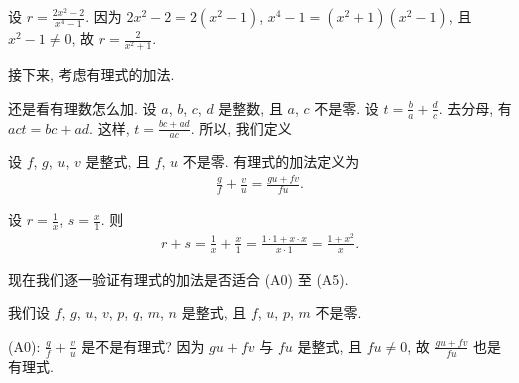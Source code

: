 \begin{example}
    设 $r = \frac{2x^2 - 2}{x^4 - 1}$. 因为 $2x^2 - 2 = 2(x^2 - 1)$, $x^4 - 1 = (x^2 + 1)(x^2 - 1)$, 且 $x^2 - 1 \neq 0$, 故 $r = \frac{2}{x^2 + 1}$.
\end{example}

接下来, 考虑有理式的加法.

还是看有理数怎么加. 设 $a$, $b$, $c$, $d$ 是整数, 且 $a$, $c$ 不是零. 设 $t = \frac{b}{a} + \frac{d}{c}$. 去分母, 有 $act = bc + ad$. 这样, $t = \frac{bc + ad}{ac}$. 所以, 我们定义
\begin{definition}
    设 $f$, $g$, $u$, $v$ 是整式, 且 $f$, $u$ 不是零. 有理式的加法定义为
    \begin{align*}
        \frac{g}{f} + \frac{v}{u} = \frac{gu + fv}{fu}.
    \end{align*}
\end{definition}

\begin{example}
    设 $r = \frac{1}{x}$, $s = \frac{x}{1}$. 则
    \begin{align*}
        r + s = \frac{1}{x} + \frac{x}{1} = \frac{1 \cdot 1 + x \cdot x}{x \cdot 1} = \frac{1 + x^2}{x}.
    \end{align*}
\end{example}


现在我们逐一验证有理式的加法是否适合 (A0) 至 (A5).

我们设 $f$, $g$, $u$, $v$, $p$, $q$, $m$, $n$ 是整式, 且 $f$, $u$, $p$, $m$ 不是零.

(A0): $\frac{g}{f} + \frac{v}{u}$ 是不是有理式? 因为 $gu + fv$ 与 $fu$ 是整式, 且 $fu \neq 0$, 故 $\frac{gu + fv}{fu}$ 也是有理式.

